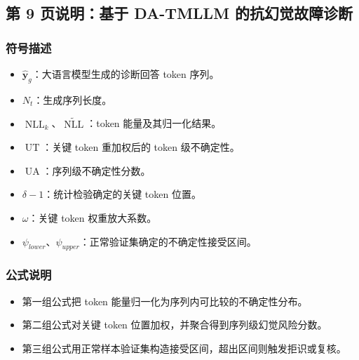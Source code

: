 ﻿\documentclass[UTF8,a4paper,10pt]{ctexart}
\begin{document}
\clearpage
\subsection*{第 9 页说明：基于 DA-TMLLM 的抗幻觉故障诊断}
\subsubsection*{符号描述}
\begin{itemize}
  \item $\hat{\bm y}_g$：大语言模型生成的诊断回答 token 序列。
  \item $N_t$：生成序列长度。
  \item $\operatorname{NLL}_k$、$\widetilde{\operatorname{NLL}}$：token 能量及其归一化结果。
  \item $\operatorname{UT}$：关键 token 重加权后的 token 级不确定性。
  \item $\operatorname{UA}$：序列级不确定性分数。
  \item $\delta-1$：统计检验确定的关键 token 位置。
  \item $\omega$：关键 token 权重放大系数。
  \item $\psi_{lower}$、$\psi_{upper}$：正常验证集确定的不确定性接受区间。
\end{itemize}
\subsubsection*{公式说明}
\begin{itemize}
  \item 第一组公式把 token 能量归一化为序列内可比较的不确定性分布。
  \item 第二组公式对关键 token 位置加权，并聚合得到序列级幻觉风险分数。
  \item 第三组公式用正常样本验证集构造接受区间，超出区间则触发拒识或复核。
\end{itemize}
\end{document}
